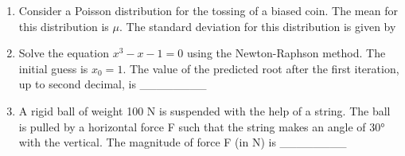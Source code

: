 \documentclass[journal,11pt,onecolumn]{IEEEtran}
\begin{document}
\begin{enumerate}
          \begin{enumerate}


          \end{enumerate}

    \item Consider a Poisson distribution for the tossing of a biased coin. The mean for this distribution is $\mu$. The standard deviation for this distribution is given by

          \begin{enumerate}


          \end{enumerate}

    \item Solve the equation $x^3 - x - 1 = 0$ using the Newton-Raphson method. The initial guess is $x_0 = 1$. The value of the predicted root after the first iteration, up to second decimal, is \_\_\_\_\_\_\_\_

    \item A rigid ball of weight 100 N is suspended with the help of a string. The ball is pulled by a horizontal force F such that the string makes an angle of 30° with the vertical. The magnitude of force F (in N) is \_\_\_\_\_\_\_\_


\end{enumerate}
\end{document}
